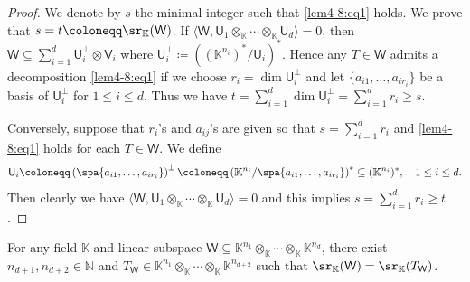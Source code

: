 \begin{proof}
We denote by $s$ the minimal integer such that \eqref{lem4-8:eq1} holds.  We prove that $s = t \coloneqq \sr_{\mathbb{K}}(\mathsf{W})$.  If $\langle \mathsf{W}, \mathsf{U}_{1} \otimes_{\mathbb{K}}  \cdots \otimes_{\mathbb{K}}  \mathsf{U}_{d}\rangle=0$,  then $\mathsf{W} \subseteq \sum_{i=1}^d \mathsf{U}_{i}^{\perp} \otimes \mathsf{V}_{i}$ where $\mathsf{U}_{i}^{\perp} \coloneqq ( (\mathbb{K}^{n_i})^\ast/\mathsf{U}_i)^\ast$.  Hence any $T\in \mathsf{W}$ admits a decomposition \eqref{lem4-8:eq1} if we choose $r_i = \dim \mathsf{U}_i^{\perp}$ and let $\{a_{i1},\dots,  a_{ir_i}\}$ be a basis of $\mathsf{U}_i^{\perp}$ for $1 \le i \le d$.  Thus we have $t = \sum_{i=1}^d \dim \mathsf{U}_i^\perp = \sum_{i=1}^d r_i \ge s$.

Conversely,  suppose that $r_i$'s and $a_{ij}$'s are given so that $s = \sum_{i=1}^d r_i$ and \eqref{lem4-8:eq1} holds for each $T \in \mathsf{W}$.  We define 
\[
\mathsf{U}_i \coloneqq \left( \spa  \{ a_{i1},\dots,  a_{ir_i} \} \right)^\perp  \coloneqq \left(\mathbb{K}^{n_i}/\spa  \{ a_{i1},\dots,  a_{ir_i} \} \right)^\ast \subseteq (\mathbb{K}^{n_i})^\ast,\quad 1 \le i \le d.
\]
Then clearly we have $\langle \mathsf{W}, \mathsf{U}_{1} \otimes_{\mathbb{K}}  \cdots \otimes_{\mathbb{K}}   \mathsf{U}_{d}\rangle = 0$ and this implies $s = \sum_{i=1}^d r_i \ge t$.
\end{proof}
\begin{lemma}\label{lem4-9}
For any field $\mathbb{K}$ and linear subspace $\mathsf{W} \subseteq \mathbb{K}^{n_1} \otimes_{\mathbb{K}}  \cdots \otimes_{\mathbb{K}}  \mathbb{K}^{n_d}$,  there exist $n_{d+1},n_{d+2} \in \mathbb{N}$ and $T_{\mathsf{W}}\in \mathbb{K}^{n_1} \otimes_{\mathbb{K}}   \cdots \otimes_{\mathbb{K}}  \mathbb{K}^{n_{d+2}}$ such that $\sr_{\mathbb{K}}(\mathsf{W}) = \sr_{\mathbb{K}}(T_{\mathsf{W}})$. 
\end{lemma}
